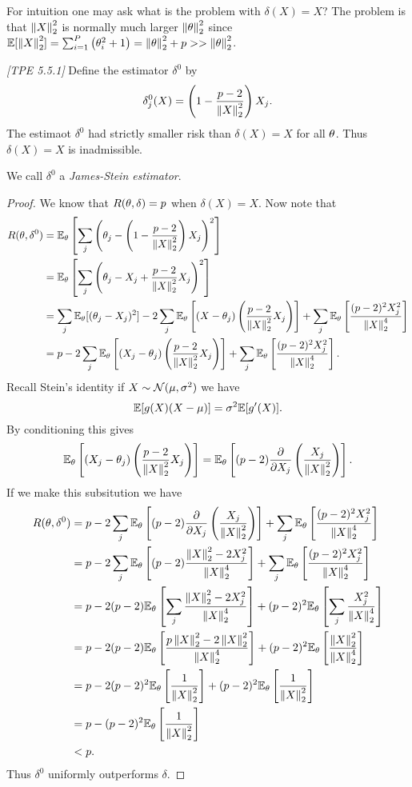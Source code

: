 For intuition one may ask what is the problem with $\delta(X)=X$? The problem is that $\left\|X\right\|_2^2$ is normally much larger $\left\|{\theta}\right\|_2^2$ since ${\mathbb{E}}[\left\|X\right\|_2^2] =\sum_{i=1}^P \left({\theta}_i^2+1\right) = \left\|{\theta}\right\|_2^2+p >> \left\|{\theta}\right\|_2^2$.
\begin{thrm}
    \emph{[TPE 5.5.1]} Define the estimator $\delta^0$ by
    \[\delta_j^0(X) = \left(1-\frac{p-2}{\left\|X\right\|_2^2}\right)X_j. \]
    The estimaot $\delta^0$ had strictly smaller risk than $\delta(X)=X$ for all ${\theta}$. Thus $\delta(X)=X$ is inadmissible.
\end{thrm}
We call $\delta^0$ a \emph{James-Stein estimator}.
\begin{proof}
    We know that $R({\theta},\delta) = p$ when $\delta(X)=X$. Now note that
    \begin{align*}
        R({\theta},\delta^0) &= {\mathbb{E}}_{\theta}\left[\sum_j \left({\theta}_j - \left(1- \frac{p-2}{\left\|X\right\|_2^2}\right)X_j\right)^2\right]\\
        &= {\mathbb{E}}_{\theta}\left[\sum_j \left({\theta}_j - X_j+ \frac{p-2}{\left\|X\right\|_2^2}X_j\right)^2\right]\\
        &=\sum_j {\mathbb{E}}_{\theta}[({\theta}_j-X_j)^2]-2\sum_j {\mathbb{E}}_{\theta}\left[(X-{\theta}_j)\left(\frac{p-2}{\left\|X\right\|_2^2}X_j\right)\right]+\sum_j {\mathbb{E}}_{\theta}\left[\frac{(p-2)^2X_j^2}{\left\|X\right\|_2^4}\right]\\
        &=p-2\sum_j {\mathbb{E}}_{\theta}\left[(X_j-{\theta}_j)\left(\frac{p-2}{\left\|X\right\|_2^2}X_j\right)\right]+\sum_j {\mathbb{E}}_{\theta}\left[\frac{(p-2)^2X_j^2}{\left\|X\right\|_2^4}\right].
    \end{align*}
    Recall Stein's identity if $X\sim {{\mathcal{N}}}(\mu,\sigma^2)$ we have
    \[{\mathbb{E}}[g(X)(X-\mu)] = \sigma^2{\mathbb{E}}[g'(X)]. \]
    By conditioning this gives 
    \[ {\mathbb{E}}_{\theta}\left[(X_j-{\theta}_j)\left(\frac{p-2}{\left\|X\right\|_2^2}X_j\right)\right] = {\mathbb{E}}_{\theta}\left[(p-2)\frac{\partial}{\partial X_j}\left(\frac{X_j}{\left\|X\right\|_2^2}\right)\right].\]
    If we make this subsitution we have
    \begin{align*}
        R({\theta},\delta^0) &=p-2\sum_j {\mathbb{E}}_{\theta}\left[(p-2)\frac{\partial}{\partial X_j}\left(\frac{X_j}{\left\|X\right\|_2^2}\right)\right]+\sum_j {\mathbb{E}}_{\theta}\left[\frac{(p-2)^2X_j^2}{\left\|X\right\|_2^4}\right]\\
        &=p-2\sum_j {\mathbb{E}}_{\theta}\left[(p-2)\frac{\left\|X\right\|_2^2-2X_j^2}{\left\|X\right\|_2^4}\right]+\sum_j {\mathbb{E}}_{\theta}\left[\frac{(p-2)^2X_j^2}{\left\|X\right\|_2^4}\right]\\
        &=p-2(p-2){\mathbb{E}}_{\theta}\left[\sum_j \frac{\left\|X\right\|_2^2-2X_j^2}{\left\|X\right\|_2^4}\right]+(p-2)^2{\mathbb{E}}_{\theta}\left[\sum_j \frac{X_j^2}{\left\|X\right\|_2^4}\right]\\
        &=p-2(p-2){\mathbb{E}}_{\theta}\left[\frac{p\left\|X\right\|_2^2-2\left\|X\right\|_2^2}{\left\|X\right\|_2^4}\right]+(p-2)^2{\mathbb{E}}_{\theta}\left[\frac{\left\|X\right\|^2_2}{\left\|X\right\|_2^4}\right]\\
        &=p-2(p-2)^2{\mathbb{E}}_{\theta}\left[\frac{1}{\left\|X\right\|_2^2}\right]+(p-2)^2{\mathbb{E}}_{\theta}\left[\frac{1}{\left\|X\right\|_2^2}\right]\\
        &=p-(p-2)^2{\mathbb{E}}_{\theta}\left[\frac{1}{\left\|X\right\|_2^2}\right]\\
        &<p.
    \end{align*}
    Thus $\delta^0$ uniformly outperforms $\delta$.
\end{proof}

